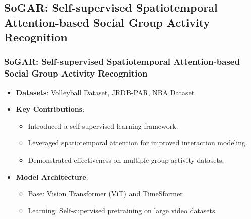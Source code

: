 \documentclass{beamer}
\begin{document}
\subsection{SoGAR: Self-supervised Spatiotemporal Attention-based Social Group Activity Recognition}
\begin{frame}
    \frametitle{SoGAR: Self-supervised Spatiotemporal Attention-based Social Group Activity Recognition}
    \begin{itemize}
        \item \textbf{Datasets}: Volleyball Dataset, JRDB-PAR, NBA Dataset
        \item \textbf{Key Contributions}:
              \begin{itemize}
                  \item Introduced a self-supervised learning framework.
                  \item Leveraged spatiotemporal attention for improved interaction modeling.
                  \item Demonstrated effectiveness on multiple group activity datasets.
              \end{itemize}
        \item \textbf{Model Architecture}:
              \begin{itemize}
                  \item Base: Vision Transformer (ViT) and TimeSformer
                  \item Learning: Self-supervised pretraining on large video datasets
              \end{itemize}
    \end{itemize}
\end{frame}
\end{document}
